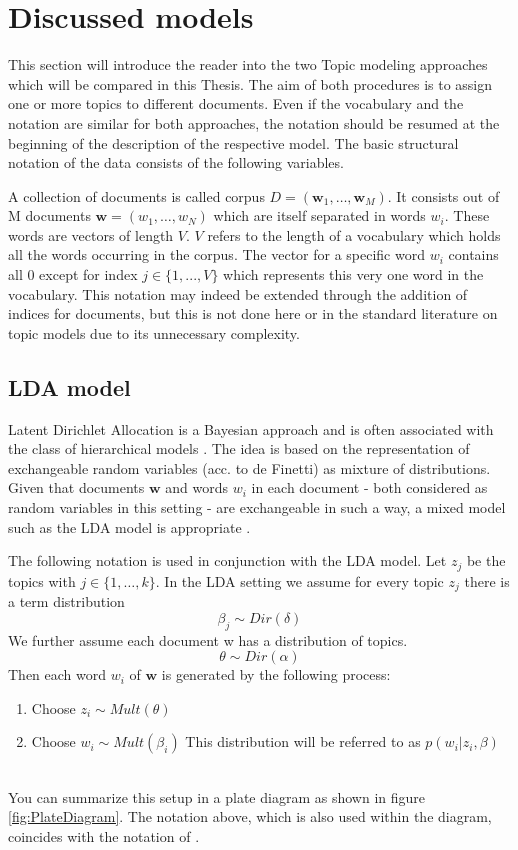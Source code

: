 \documentclass[11pt,a4paper]{article}
\author{Sebastian Knigge}
\begin{document}
\section{Discussed models}

This section will introduce the reader into the two Topic modeling approaches which will be compared in this Thesis. The aim of both procedures is to assign one or more topics to different documents. Even if the vocabulary and the notation are similar for both approaches, the notation should be resumed at the beginning of the description of the respective model. The basic structural notation of the data consists of the following variables.

A collection of documents is called corpus $D=(\textbf{w}_1,\dots , \textbf{w}_M)$. It consists out of M documents $\textbf{w}=(w_1,\dots, w_N)$ which are itself separated in words $w_i$. These words are vectors of length $V$. $V$ refers to the length of a vocabulary which holds all the words occurring in the corpus. The vector for a specific word $w_i$ contains all 0 except for index $j\in\{1,...,V\}$ which represents this very one word in the vocabulary.
This notation may indeed be extended through the addition of indices for documents, but this is not done here or in the standard literature on topic models due to its unnecessary complexity.

\subsection{LDA model}

Latent Dirichlet Allocation is a Bayesian approach and is often associated with the class of hierarchical models \cite{Gelman2014}. The idea is based on the representation of exchangeable random variables (acc. to de Finetti) as 
mixture of distributions. Given that documents $\textbf{w}$ and words $w_i$ in each document - both considered as random variables in this setting - are exchangeable in such a way, a mixed model such as the LDA model is appropriate \cite{Blei2003}.

The following notation is used in conjunction with the LDA model. Let $z_j$ be the topics with $j\in\{1,\dots,k\}$. In the LDA setting we assume for  every topic $z_j$ there is a term distribution
$$\beta_j \sim Dir(\delta)$$
We further assume each document w has a distribution of topics.
$$\theta \sim Dir(\alpha)$$
Then each word $w_i$ of $\textbf{w}$ is generated by the following process:

\begin{enumerate}
	\item Choose $z_i \sim Mult(\theta)$
	
	\item Choose $w_i \sim Mult(\beta_i)$ This distribution will be referred to as $p(w_i|z_i,\beta)$
\end{enumerate}
\ \\
You can summarize this setup in a plate diagram as shown in figure \ref{fig:PlateDiagram}. The notation above, which is also used within the diagram, coincides with the notation of \cite{Hornik2011}.\\
\end{document}
